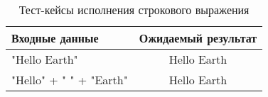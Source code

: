 \clearpage

\begin{table}[!ht]
    \Large
    \centering
    \begin{threeparttable}
        \caption{Тест-кейсы исполнения строкового выражения}
        \label{t:testCases_stringExpr}
        \begin{tabularx}{\textwidth}{|X|c|}
            \hline
            Входные данные          & Ожидаемый результат \\
            \hline
            "Hello Earth"           & Hello Earth         \\
            \hline
            "Hello" + " " + "Earth" & Hello Earth         \\
            \hline
        \end{tabularx}
    \end{threeparttable}
    \vspace{\bottompaddingoftable}
\end{table}

